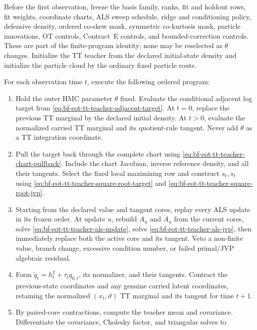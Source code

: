 Before the first observation, freeze the basis family, ranks, fit and holdout
rows, fit weights, coordinate charts, ALS sweep schedule, ridge and
conditioning policy, defensive density, ordered co-skew mask, symmetric
co-kurtosis mask, particle innovations, OT controls, Contract~E controls, and
bounded-correction controls.  These are part of the finite-program identity;
none may be reselected as \(\theta\) changes.  Initialize the TT teacher from
the declared initial-state density and initialize the particle cloud by the
ordinary fixed particle route.

For each observation time \(t\), execute the following ordered program:
\begin{enumerate}[label=(\arabic*)]
 \item Hold the outer HMC parameter \(\theta\) fixed.  Evaluate the conditional
       adjacent log target from
       \eqref{eq:bf-eot-tt-teacher-adjacent-target}.  At \(t=0\), replace the
       previous TT marginal by the declared initial density.  At \(t>0\),
       evaluate the normalized carried TT marginal and its quotient-rule
       tangent.  Never add \(\theta\) as a TT integration coordinate.
 \item Pull the target back through the complete chart using
       \eqref{eq:bf-eot-tt-teacher-chart-pullback}.  Include the chart Jacobian,
       inverse reference density, and all their tangents.  Select the fixed
       local maximizing row and construct \(s_t,\dot s_t\) using
       \eqref{eq:bf-eot-tt-teacher-square-root-target} and
       \eqref{eq:bf-eot-tt-teacher-square-root-jvp}.
 \item Starting from the declared value and tangent cores, replay every ALS
       update in its frozen order.  At update \(u\), rebuild \(A_u\) and
       \(\dot A_u\) from the current cores, solve
       \eqref{eq:bf-eot-tt-teacher-als-update}, solve
       \eqref{eq:bf-eot-tt-teacher-als-jvp}, then immediately replace both the
       active core and its tangent.  Veto a non-finite value, branch change,
       excessive condition number, or failed primal/JVP algebraic residual.
 \item Form \(\widetilde q_t=h_t^2+\tau_tq_{0,t}\), its normalizer, and their
       tangents.  Contract the previous-state coordinates and any genuine
       carried latent coordinates, retaining the normalized
       \((x_t,\vartheta)\) TT marginal and its tangent for time \(t+1\).
 \item By paired-core contractions, compute the teacher mean and covariance.
       Differentiate the covariance, Cholesky factor, and triangular solves to

\end{enumerate}
